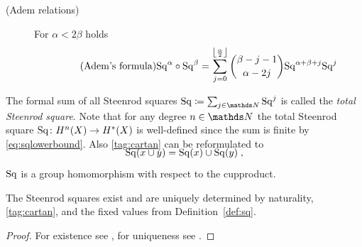 \begin{Def}
\begin{description}
  \item[(Adem relations)] For $\alpha<2\beta$ holds
    \begin{gather}\label{tag:adem}\tag{Adem's formula}
      \mathrm{Sq}^{\alpha} \circ \mathrm{Sq}^{\beta} =
      \sum_{j=0}^{\left\lfloor \frac \alpha 2 \right\rfloor}
      \binom{\beta-j-1}{\alpha-2j}
      \mathrm{Sq}^{\alpha+\beta+j}\mathrm{Sq}^{j}
    \end{gather}
  \end{description}
  The formal sum of all Steenrod squares
  $\SQ\coloneqq\sum_{j\in\Nat}\Sq j$ is called the \emph{total Steenrod square}.
  Note that for any degree $n\in\Nat$ the total Steenrod square
  $\mathrm{Sq}\colon H^n(X)\to H^*(X)$ is well-defined since the sum is
  finite by \eqref{eq:sqlowerbound}.
  Also \ref{tag:cartan} can be reformulated to
  \begin{gather*}
    \SwapAboveDisplaySkip
    \SQ(x\cup y) = \SQ(x)\cup\SQ(y)
    \;,
  \end{gather*}
  \idest $\mathrm{Sq}$ is a group
  homomorphism with respect to the cup\nbd{}product.
\end{Def}

\begin{Thm}
  The Steenrod squares exist and are uniquely determined by
  naturality, \ref{tag:cartan}, and the fixed values
  from Definition~\ref{def:sq}.
  \begin{proof}
    For existence see \cite[Chapter 2]{mosher},
    for uniqueness see \cite[VIII §3]{steenrodepstein}.
  \end{proof}
\end{Thm}

